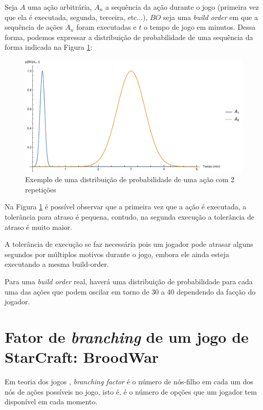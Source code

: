 Seja $A$ uma ação arbitrária, $A_n$ a sequência da ação durante o jogo (primeira vez que ela é executada, segunda, terceira, etc...), $BO$ seja uma \textit{build order} em que a sequência de ações $A_n$ foram executadas e $t$ o tempo de jogo em minutos. Dessa forma, podemos expressar a distribuição de probabilidade de uma sequência da forma indicada na Figura \ref{fig:rev-distribuicao-exemplo}:

\begin{figure}[htb]
	\caption{\label{fig:rev-distribuicao-exemplo}Exemplo de uma distribuição de probabilidade de uma ação com 2 repetições}
	\begin{center}
	    \includegraphics[width=\linewidth]{../Mathematica/Distribuicao1.pdf}
	\end{center}
\end{figure}

Na Figura \ref{fig:rev-distribuicao-exemplo} é possível observar que a primeira vez que a ação é executada, a tolerância para atraso é pequena, contudo, na segunda execução a tolerância de atraso é muito maior.

A tolerância de execução se faz necessária pois um jogador pode atrasar alguns segundos por múltiplos motivos durante o jogo, embora ele ainda esteja executando a mesma build-order.

Para uma \textit{build order} real, haverá uma distribuição de probabilidade para cada uma das ações que podem oscilar em torno de 30 a 40 dependendo da facção do jogador.

		\section{Fator de \textit{branching} de um jogo de StarCraft: BroodWar}
Em teoria dos jogos , \textit{branching factor} é o número de nós-filho em cada um dos nós de ações possíveis no jogo, isto é, é o número de opções que um jogador tem disponível em cada momento.

